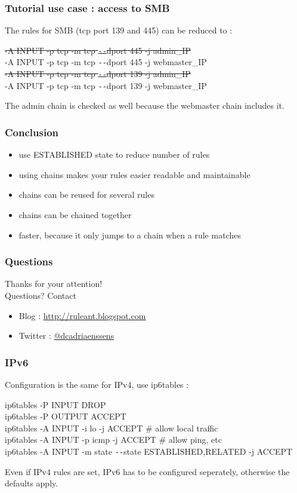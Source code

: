 \documentclass[14pt]{beamer}
\newcommand{\dd}{{\texttt{-{}-}}}
\begin{document}
  \begin{frame}
    \frametitle{Tutorial use case : access to SMB}
    The rules for SMB (tcp port 139 and 445) can be reduced to :
    \begin{example}
      \small{\sout{{\color{red}-A INPUT -p tcp -m tcp \dd dport 445 -j admin\_IP}}\\
      -A INPUT -p tcp -m tcp \dd dport 445 -j webmaster\_IP\\
      \sout{{\color{red}-A INPUT -p tcp -m tcp \dd dport 139 -j admin\_IP}}\\
      -A INPUT -p tcp -m tcp \dd dport 139 -j webmaster\_IP}
    \end{example}
  The admin chain is checked as well because the webmaster chain includes it.
  \end{frame}

  \begin{frame}
    \frametitle{Conclusion}
    \begin{itemize}
      \item use ESTABLISHED state to reduce number of rules
      \item using chains makes your rules easier readable and maintainable
      \item chains can be reused for several rules
      \item chains can be chained together
      \item faster, because it only jumps to a chain when a rule matches
    \end{itemize}
  \end{frame}
  \begin{frame}
   \frametitle{Questions}
    Thanks for your attention!\\
    Questions?
    \vfill
    Contact
    \begin{itemize}
      \item Blog : \href{http://ruleant.blogspot.com/}{http://ruleant.blogspot.com}
      \item Twitter : \href{https://twitter.com/dcadriaenssens}{@dcadriaenssens}
    \end{itemize}
  \end{frame}
  \begin{frame}
    \frametitle{IPv6}
    Configuration is the same for IPv4, use ip6tables :
    \begin{example}
      \small{ip6tables -P INPUT DROP\\
      ip6tables -P OUTPUT ACCEPT\\
      ip6tables -A INPUT -i lo -j ACCEPT \# allow local traffic\\
      ip6tables -A INPUT -p icmp -j ACCEPT \# allow ping, etc\\
      ip6tables -A INPUT -m state \dd state ESTABLISHED,RELATED -j ACCEPT}
    \end{example}
    Even if IPv4 rules are set, IPv6 has to be configured seperately, otherwise the defaults apply.
  \end{frame}
\end{document}
